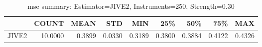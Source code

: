 \begin{table}[ht]
\centering
\caption{mse summary: Estimator=JIVE2, Instruments=250, Strength=0.30}
\begin{tabular}{lrrrrrrrr}
\toprule
 & COUNT & MEAN & STD & MIN & 25\% & 50\% & 75\% & MAX \\
\midrule
JIVE2 & 10.0000 & 0.3899 & 0.0330 & 0.3189 & 0.3800 & 0.3884 & 0.4122 & 0.4326 \\
\bottomrule
\end{tabular}
\end{table}
